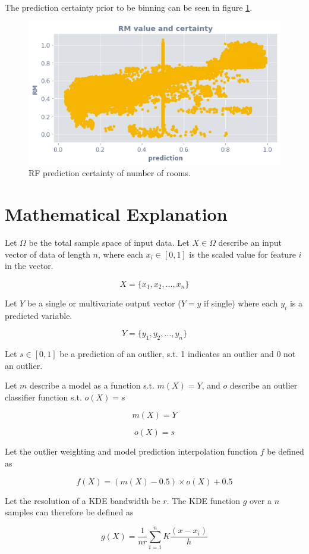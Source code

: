 \documentclass[a4paper, twocolumn]{article}
\begin{document}
The prediction certainty prior to be binning can be seen in figure \ref{fig:reg-rf-ocsvm-rm}.

\begin{figure}
\centering
\includegraphics[width=0.7\columnwidth]{img/reg_rf_ocsvm_rm.png}
\caption{RF prediction certainty of number of rooms.}
\label{fig:reg-rf-ocsvm-rm}
\end{figure}

\section{Mathematical Explanation}

Let $\Omega$ be the total sample space of input data. Let $X \in \Omega$ describe an input vector of data of length $n$, where each $x_i \in [0, 1]$ is the scaled value for feature $i$ in the vector.

$$X = \{x_1, x_2, \ldots, x_n\}$$

Let $Y$ be a single or multivariate output vector ($Y = y$ if single) where each $y_i$ is a predicted variable.

$$Y = \{y_1, y_2, \ldots, y_n\}$$

Let $s \in [0, 1]$ be a prediction of an outlier, s.t. 1 indicates an outlier and 0 not an outlier.

Let $m$ describe a model as a function s.t. $m(X) = Y$, and $o$ describe an outlier classifier function s.t. $o(X) = s$

$$m(X) = Y$$

$$o(X) = s$$

Let the outlier weighting and model prediction interpolation function $f$ be defined as

$$f(X) = (m(X) - 0.5) \times o(X) + 0.5$$

Let the resolution of a KDE bandwidth be $r$. The KDE function $g$ over a $n$ samples can therefore be defined as

$$g(X) = \frac{1}{nr} \sum^n_{i=1} K \frac{(x - x_i)}{h}$$
\end{document}
